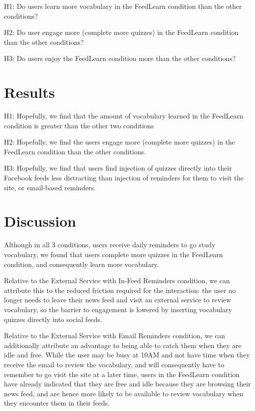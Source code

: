\documentclass{chi-ext}
\begin{document}
H1: Do users learn more vocabulary in the FeedLearn condition than the other conditions?

H2: Do user engage more (complete more quizzes) in the FeedLearn condition than the other conditions?

H3: Do users enjoy the FeedLearn condition more than the other conditions?

\section{Results}

H1: Hopefully, we find that the amount of vocabulary learned in the FeedLearn condition is greater than the other two conditions

H2: Hopefully, we find the users engage more (complete more quizzes) in the FeedLearn condition than the other conditions.

H3: Hopefully, we find that users find injection of quizzes directly into their Facebook feeds less distracting than injection of reminders for them to visit the site, or email-based reminders.

\section{Discussion}

Although in all 3 conditions, users receive daily reminders to go study vocabulary, we found that users complete more quizzes in the FeedLearn condition, and consequently learn more vocabulary.

Relative to the External Service with In-Feed Reminders condition, we can attribute this to the reduced friction required for the interaction: the user no longer needs to leave their news feed and visit an external service to review vocabulary, so the barrier to engagement is lowered by inserting vocabulary quizzes directly into social feeds.

Relative to the External Service with Email Reminders condition, we can additionally attribute an advantage to being able to catch them when they are idle and free. While the user may be busy at 10AM and not have time when they receive the email to review the vocabulary, and will consequently have to remember to go visit the site at a later time, users in the FeedLearn condition have already indicated that they are free and idle because they are browsing their news feed, and are hence more likely to be available to review vocabulary when they encounter them in their feeds.
\end{document}
